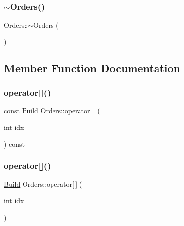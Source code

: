 \mbox{\label{class_orders_a12bcbd0cd430b51f65f651fddad3f662}} 
\subsubsection{\texorpdfstring{$\sim$Orders()}{~Orders()}}
{\footnotesize\ttfamily Orders\+::$\sim$\+Orders (\begin{DoxyParamCaption}{ }\end{DoxyParamCaption})\hspace{0.3cm}{\ttfamily [inline]}}



\subsection{Member Function Documentation}
\mbox{\label{class_orders_a9574f4521c39b8a8d7cdfd1f28b07ffb}} 
\subsubsection{\texorpdfstring{operator[]()}{operator[]()}\hspace{0.1cm}{\footnotesize\ttfamily [1/2]}}
{\footnotesize\ttfamily const \mbox{\hyperlink{class_build}{Build}} Orders\+::operator\mbox{[}$\,$\mbox{]} (\begin{DoxyParamCaption}\item[{int}]{idx }\end{DoxyParamCaption}) const\hspace{0.3cm}{\ttfamily [inline]}}

\mbox{\label{class_orders_abae5fb4a0e7dfa2c222215850531d695}} 
\subsubsection{\texorpdfstring{operator[]()}{operator[]()}\hspace{0.1cm}{\footnotesize\ttfamily [2/2]}}
{\footnotesize\ttfamily \mbox{\hyperlink{class_build}{Build}} Orders\+::operator\mbox{[}$\,$\mbox{]} (\begin{DoxyParamCaption}\item[{int}]{idx }\end{DoxyParamCaption})\hspace{0.3cm}{\ttfamily [inline]}}

